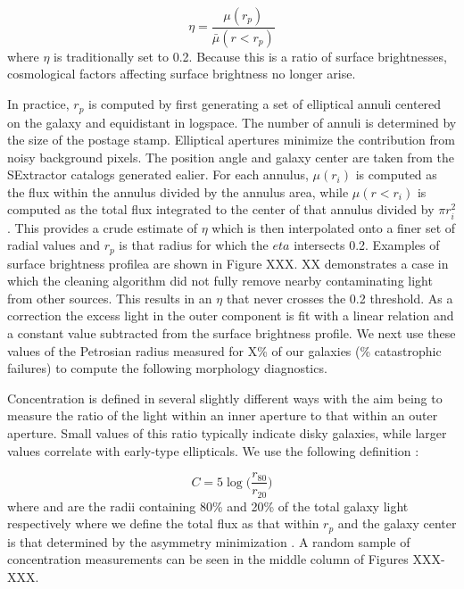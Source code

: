 \begin{equation}
\eta = \frac{\mu(r_p)}{\bar\mu(r<r_p)}
\end{equation}
where $\eta$ is traditionally set to 0.2. Because this is a ratio of surface brightnesses, cosmological factors affecting surface brightness no longer arise. 

In practice, $r_p$ is computed by first generating a set of elliptical annuli centered on the galaxy and equidistant in logspace. The number of annuli is determined by the size of the postage stamp. Elliptical apertures minimize the contribution from noisy background pixels. The position angle and galaxy center are taken from the SExtractor catalogs generated ealier. For each annulus, $\mu(r_i)$ is computed as the flux within the annulus divided by the annulus area, while $\mu(r<r_i)$ is computed as the total flux integrated to the center of that annulus divided by $\pi r_i^2$. This provides a crude estimate of $\eta$ which is then interpolated onto a finer set of radial values and $r_p$ is that radius for which the $eta$ intersects 0.2. Examples of surface brightness profilea are shown in Figure XXX. XX demonstrates a case in which the cleaning algorithm did not fully remove nearby contaminating light from other sources. This results in an $\eta$ that never crosses the 0.2 threshold. As a correction the excess light in the outer component is fit with a linear relation and a constant value subtracted from  the surface brightness profile. We next use these values of the Petrosian radius measured for X\% of our galaxies (\% catastrophic failures) to compute the following morphology diagnostics.



Concentration is defined in several slightly different ways with the aim being to measure the ratio of the light within an inner aperture to that within an outer aperture. Small values of this ratio typically indicate disky galaxies, while larger values correlate with early-type ellipticals. We use the following definition \citep{Bershady2000}:

\begin{equation}{}
C = 5\log\Big(\frac{r_{80}}{r_{20}}\Big) 
\end{equation}
where  and  are the radii containing 80\% and 20\% of the total galaxy light respectively where we define the total flux as that within $r_p$ and the galaxy center is that determined by the asymmetry minimization \cite[described below,][]{Lotz2004}. A random sample of concentration measurements can be seen in the middle column of Figures XXX-XXX. 

